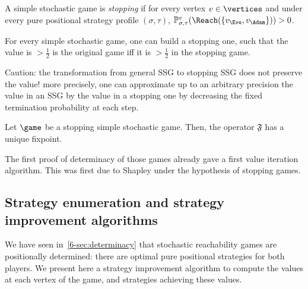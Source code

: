 \begin{definition}
\label{6-def:stopping_simple_stochastic_games}
A simple stochastic game is \emph{stopping} if for every vertex
$v \in \vertices$ and under every pure positional strategy profile
$(\sigma,\tau)$, $\probm_{\sigma,\tau}^v(\Reach(\{v_\Eve,v_\Adam\})) >0$.
\end{definition}


\begin{theorem}
\label{6-thm:reduction_stopping_games}
For every simple stochastic game, one can build a  stopping  one, such that the value is $> \frac{1}{2}$ is the original game iff it is $>\frac{1}{2}$ in the stopping game. 
\end{theorem}

Caution: the transformation from general SSG to stopping
SSG does not preserve the value! more precisely, one can approximate
up to an arbitrary precision the value in an SSG by the value in a
stopping one by decreasing the fixed termination probability at each step.

\begin{proposition}
\label{6-prop:fixed_point_characterisation_stopping_ssg}
Let $\game$ be a stopping simple stochastic game. Then, the operator $\mathfrak{F}$ has a unique fixpoint.
\end{proposition}

The first proof of determinacy of those games already gave a first
value iteration algorithm. This was first due to Shapley under the
hypothesis of stopping games.



\subsection{Strategy enumeration and strategy improvement algorithms}

%


We have seen in~\cref{6-sec:determinacy} that stochastic
reachability games are positionally determined: there are optimal
 pure positional strategies for both players. We present here a
strategy improvement algorithm to compute the values at each vertex of
the game, and strategies achieving these values.

